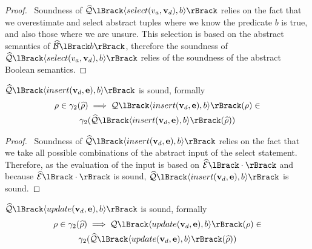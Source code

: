 \begin{proof}
    \pfsketch\
    Soundness of $\abssqlsem{\langle select(v_a, \mathbf{v}_d), b \rangle}$ relies on the fact that we overestimate and select abstract tuples where we know the predicate $b$ is true, and also those where we are unsure.
    This selection is based on the abstract semantics of $\absboolsem{b}$, therefore the soundness of $\abssqlsem{\langle select(v_a, \mathbf{v}_d), b \rangle}$ relies of the soundness of the abstract Boolean semantics.
\end{proof}


\begin{conjecture}
    \label{thm:sound-insert}
    $\abssqlsem{\langle insert(\mathbf{v}_d, \mathbf{e}), b \rangle}$ is sound, formally
    \begin{multline*}
        \environment \in \concrete_2(\ab{\environment}) \implies \sqlsem{\langle insert(\mathbf{v}_d, \mathbf{e}), b \rangle}(\environment) \in \\
        \concrete_2(\abssqlsem{\langle insert(\mathbf{v}_d, \mathbf{e}), b \rangle}(\ab{\environment}))
    \end{multline*}

\end{conjecture}


\begin{proof}
    \pfsketch\
    Soundness of $\abssqlsem{\langle insert(\mathbf{v}_d, \mathbf{e}), b \rangle}$ relies on the fact that we take all possible combinations of the abstract input of the select statement.
    Therefore, as the evaluation of the input is based on $\absexpsem{\cdot}$ and because $\absexpsem{\cdot}$ is sound, $\abssqlsem{\langle insert(\mathbf{v}_d, \mathbf{e}), b \rangle}$ is sound.
\end{proof}


\begin{conjecture}
    \label{thm:sound-update}
    $\abssqlsem{\langle update(\absattrs, \absexps), b \rangle}$ is sound, formally
    \begin{multline*}
        \environment \in \concrete_2(\ab{\environment}) \implies \sqlsem{\langle update(\absattrs, \absexps), b \rangle}(\environment) \in \\
        \concrete_2(\abssqlsem{\langle update(\absattrs, \absexps), b \rangle}(\ab{\environment}))
    \end{multline*}
\end{conjecture}


